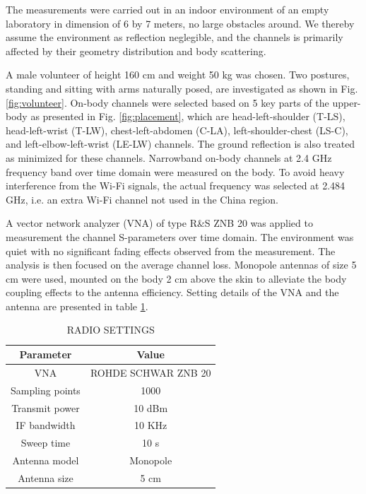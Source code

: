 \documentclass[conference]{IEEEtran}
\begin{document}
The measurements were carried out in an indoor environment of an empty laboratory in dimension of 6 by 7 meters, no large obstacles around. We thereby assume the environment as reflection neglegible, and the channels is primarily affected by their geometry distribution and body scattering.

A male volunteer of height 160 cm and weight 50 kg was chosen. Two postures, standing and sitting with arms naturally posed, are investigated as shown in Fig. \ref{fig:volunteer}. On-body channels were selected based on 5 key parts of the upper-body as presented in Fig. \ref{fig:placement}, which are head-left-shoulder (T-LS), head-left-wrist (T-LW), chest-left-abdomen (C-LA), left-shoulder-chest (LS-C), and left-elbow-left-wrist (LE-LW) channels. The ground reflection is also treated as minimized for these channels. Narrowband on-body channels at 2.4 GHz frequency band over time domain were measured on the body. To avoid heavy interference from the Wi-Fi signals, the actual frequency was selected at 2.484 GHz, i.e. an extra Wi-Fi channel not used in the China region.

A vector network analyzer (VNA) of type R\&S ZNB 20 was applied to measurement the channel S-parameters over time domain. The environment was quiet with no significant fading effects observed from the measurement. The analysis is then focused on the average channel loss. Monopole antennas of size 5 cm were used, mounted on the body 2 cm above the skin to alleviate the body coupling effects to the antenna efficiency. Setting details of the VNA and the antenna are presented in table \ref{tab:1}.

\begin{table}[!t]
\centering
\captionsetup{labelsep=newline}
\caption{RADIO SETTINGS}
\label{tab:1}
\begin{tabular}{cc}
\hline
Parameter&Value\\
\hline
VNA&ROHDE SCHWAR ZNB 20\\
Sampling points&1000\\
Transmit power&10 dBm\\
IF bandwidth&10 KHz\\
Sweep time&10 s\\
\hline
Antenna model&Monopole\\
Antenna size&5 cm\\
\hline
\end{tabular}
\end{table}
\end{document}

